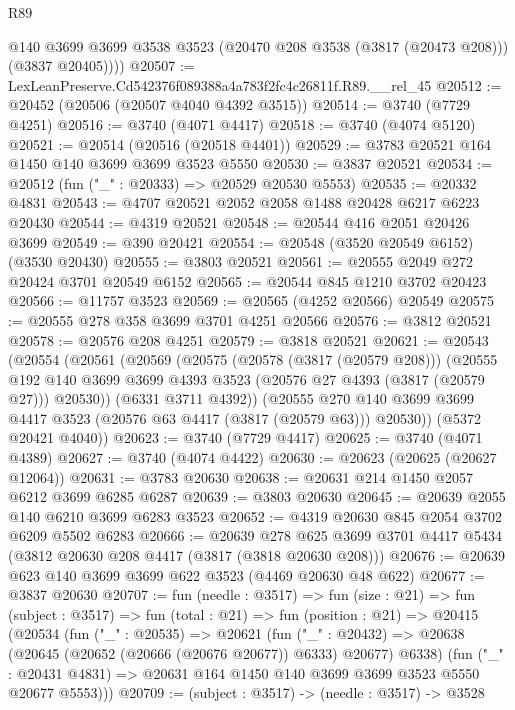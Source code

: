 \begin{lexlean}{R89}
\begin{coremodule}
          @140
          @3699
          @3699
          @3538
          @3523
          (@20470 @208 @3538 (@3817 (@20473 @208)))
          (@3837 @20405))))
@20507 := LexLeanPreserve.Cd542376f089388a4a783f2fc4c26811f.R89.__rel_45
@20512 := @20452 (@20506 (@20507 @4040 @4392 @3515))
@20514 := @3740 (@7729 @4251)
@20516 := @3740 (@4071 @4417)
@20518 := @3740 (@4074 @5120)
@20521 := @20514 (@20516 (@20518 @4401))
@20529 := @3783 @20521 @164 @1450 @140 @3699 @3699 @3523 @5550
@20530 := @3837 @20521
@20534 := @20512 (fun ("_" : @20333) => @20529 @20530 @5553)
@20535 := @20332 @4831
@20543 := @4707 @20521 @2052 @2058 @1488 @20428 @6217 @6223 @20430
@20544 := @4319 @20521
@20548 := @20544 @416 @2051 @20426 @3699
@20549 := @390 @20421
@20554 := @20548 (@3520 @20549 @6152) (@3530 @20430)
@20555 := @3803 @20521
@20561 := @20555 @2049 @272 @20424 @3701 @20549 @6152
@20565 := @20544 @845 @1210 @3702 @20423
@20566 := @11757 @3523
@20569 := @20565 (@4252 @20566) @20549
@20575 := @20555 @278 @358 @3699 @3701 @4251 @20566
@20576 := @3812 @20521
@20578 := @20576 @208 @4251
@20579 := @3818 @20521
@20621 := @20543
    (@20554
      (@20561
        (@20569
          (@20575
            (@20578 (@3817 (@20579 @208)))
            (@20555
              @192
              @140
              @3699
              @3699
              @4393
              @3523
              (@20576 @27 @4393 (@3817 (@20579 @27)))
              @20530))
          (@6331 @3711 @4392))
        (@20555 @270 @140 @3699 @3699 @4417 @3523 (@20576 @63 @4417 (@3817 (@20579 @63))) @20530))
      (@5372 @20421 @4040))
@20623 := @3740 (@7729 @4417)
@20625 := @3740 (@4071 @4389)
@20627 := @3740 (@4074 @4422)
@20630 := @20623 (@20625 (@20627 @12064))
@20631 := @3783 @20630
@20638 := @20631 @214 @1450 @2057 @6212 @3699 @6285 @6287
@20639 := @3803 @20630
@20645 := @20639 @2055 @140 @6210 @3699 @6283 @3523
@20652 := @4319 @20630 @845 @2054 @3702 @6209 @5502 @6283
@20666 := @20639
    @278
    @625
    @3699
    @3701
    @4417
    @5434
    (@3812 @20630 @208 @4417 (@3817 (@3818 @20630 @208)))
@20676 := @20639 @623 @140 @3699 @3699 @622 @3523 (@4469 @20630 @48 @622)
@20677 := @3837 @20630
@20707 := fun (needle : @3517) =>
  fun (size : @21) =>
  fun (subject : @3517) =>
  fun (total : @21) =>
  fun (position : @21) =>
  @20415
    (@20534
      (fun ("_" : @20535) =>
      @20621
        (fun ("_" : @20432) => @20638 (@20645 (@20652 (@20666 (@20676 @20677)) @6333) @20677) @6338)
        (fun ("_" : @20431 @4831) => @20631 @164 @1450 @140 @3699 @3699 @3523 @5550 @20677 @5553)))
@20709 := (subject : @3517) -> (needle : @3517) -> @3528

\end{coremodule}
\end{lexlean}
